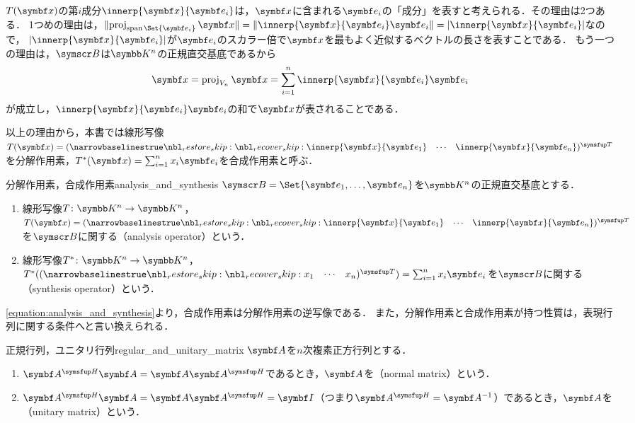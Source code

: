 \documentclass[../../main]{subfiles}
\begin{document}
\(T(\vect{x})\)の第\(i\)成分\(\innerp{\vect{x}}{\vect{e}_i}\)は，\(\vect{x}\)に含まれる\(\vect{e}_i\)の「成分」を表すと考えられる．その理由は2つある．
1つめの理由は，\(\vnorm{\proj_{\spannedby\Set{\vect{e}_i}}\vect{x}}=\vnorm{\innerp{\vect{x}}{\vect{e}_i}\vect{e}_i}=\abs{\innerp{\vect{x}}{\vect{e}_i}}\)なので，
\(\abs{\innerp{\vect{x}}{\vect{e}_i}}\)が\(\vect{e}_i\)のスカラー倍で\(\vect{x}\)を最もよく近似するベクトルの長さを表すことである．
もう一つの理由は，\(\basis{B}\)は\(\numset{K}^n\)の正規直交基底であるから
\begin{equation}
  \label{equation:analysis_and_synthesis}
  \vect{x} = \proj_{V_n}\vect{x}
  = \sum_{i=1}^n\innerp{\vect{x}}{\vect{e}_i}\vect{e}_i
\end{equation}
が成立し，\(\innerp{\vect{x}}{\vect{e}_i}\vect{e}_i\)の和で\(\vect{x}\)が表されることである．

以上の理由から，本書では線形写像\(T(\vect{x})=\trps{\rowvect{\innerp{\vect{x}}{\vect{e}_1} & \cdots & \innerp{\vect{x}}{\vect{e}_n}}}\)を分解作用素，\(\synth{T}(\vect{x})=\sum_{i=1}^nx_i\vect{e}_i\)を合成作用素と呼ぶ．

\begin{definition}{分解作用素，合成作用素}{analysis_and_synthesis}
  \(\basis{B}=\Set{\vect{e}_1,\dots,\vect{e}_n}\)を\(\numset{K}^n\)の正規直交基底とする．
  \begin{enumerate}
    \item 線形写像\(T\colon\numset{K}^n\to\numset{K}^n\)，\(T(\vect{x})=\trps{\rowvect{\innerp{\vect{x}}{\vect{e}_1} & \cdots & \innerp{\vect{x}}{\vect{e}_n}}}\)を\(\basis{B}\)に関する（analysis operator）という．
    \item 線形写像\(\synth{T}\colon\numset{K}^n\to\numset{K}^n\)，\(\synth{T}(\trps{\rowvect{x_1 & \cdots & x_n}})=\sum_{i=1}^nx_i\vect{e}_i\)を\(\basis{B}\)に関する（synthesis operator）という．
  \end{enumerate}
\end{definition}

\cref{equation:analysis_and_synthesis}より，合成作用素は分解作用素の逆写像である．
また，分解作用素と合成作用素が持つ性質は，表現行列に関する条件へと言い換えられる．

\begin{definition}{正規行列，ユニタリ行列}{regular_and_unitary_matrix}
  \(\mat{A}\)を\(n\)次複素正方行列とする．
  \begin{enumerate}
    \item \(\htrps{\mat{A}}\mat{A}=\mat{A}\htrps{\mat{A}}\)であるとき，\(\mat{A}\)を（normal matrix）という．
    \item \(\htrps{\mat{A}}\mat{A}=\mat{A}\htrps{\mat{A}}=\imat\)（つまり\(\htrps{\mat{A}}=\mat{A}^{-1}\)）であるとき，\(\mat{A}\)を（unitary matrix）という．
  \end{enumerate}
\end{definition}
\end{document}
